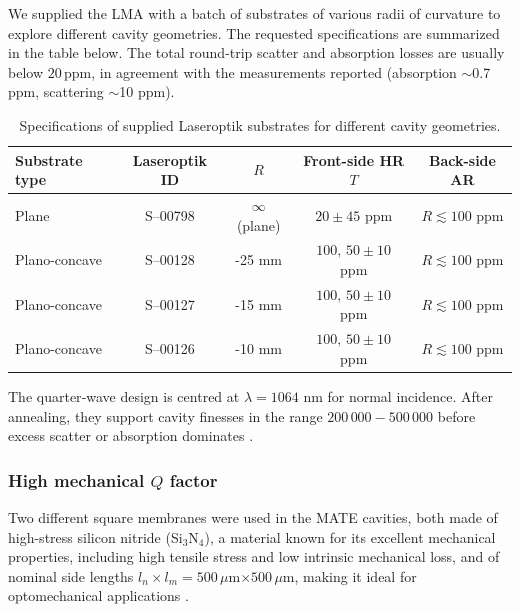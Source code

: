 We supplied the LMA with a batch of substrates of various radii of curvature to explore different cavity geometries. The requested specifications are summarized in the table below. The total round‐trip scatter and absorption losses are usually below $ 20\,$ppm, in agreement with the measurements reported (absorption $\sim$0.7 ppm, scattering $\sim$10 ppm).
\begin{table}[h!]
\centering
\begin{tabular}{lcccc}
\textbf{Substrate type} & \textbf{Laseroptik ID} & \textbf{$R$} &
\textbf{Front-side HR $T$} & \textbf{Back-side AR} \\
\hline
Plane         & S--00798 & $\infty$ (plane) & $20 \pm 45$ ppm        & $R \lesssim 100$ ppm \\
Plano-concave & S--00128 & -25 mm           & $100,\,50 \pm 10$ ppm  & $R \lesssim 100$ ppm \\
Plano-concave & S--00127 & -15 mm           & $100,\,50 \pm 10$ ppm  & $R \lesssim 100$ ppm \\
Plano-concave & S--00126 & -10 mm           & $100,\,50 \pm 10$ ppm  & $R \lesssim 100$ ppm \\
\end{tabular}
\caption{Specifications of supplied Laseroptik substrates for different cavity geometries.}
\end{table}

The quarter‐wave design is centred at $\lambda = 1064$ nm for normal incidence.  After annealing, they support cavity finesses in the range $200\,000-500\,000$ before excess scatter or absorption dominates \cite{amato}. 

\subsubsection{High mechanical $Q$ factor} 

Two different square membranes were used in the MATE cavities, both made of high-stress silicon nitride (Si$_3$N$_4$), a material known for its excellent mechanical properties, including high tensile stress and low intrinsic mechanical loss, and of nominal side lengths $l_n \times l_m = 500\,\mu $m$\times500\,\mu$m, making it ideal for optomechanical applications \cite{regal,zwickl}.  \\ 

